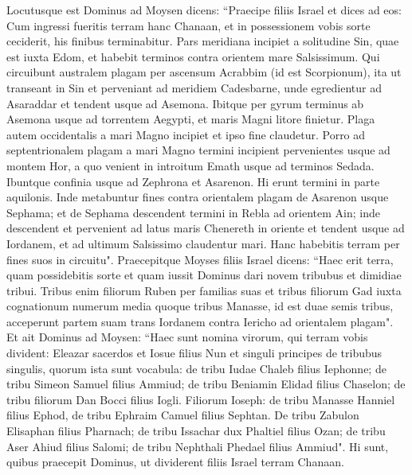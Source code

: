 \begin{biblechapter}  
\verse Locutusque est Dominus ad Moysen dicens: 
\verse “Praecipe filiis Israel et dices ad eos: Cum ingressi fueritis terram hanc Chanaan, et in possessionem vobis sorte ceciderit, his finibus terminabitur. 
\verse Pars meridiana incipiet a solitudine Sin, quae est iuxta Edom, et habebit terminos contra orientem mare Salsissimum. 
\verse Qui circuibunt australem plagam per ascensum Acrabbim (id est Scorpionum), ita ut transeant in Sin et perveniant ad meridiem Cadesbarne, unde egredientur ad Asaraddar et tendent usque ad Asemona. 
\verse Ibitque per gyrum terminus ab Asemona usque ad torrentem Aegypti, et maris Magni litore finietur. 
\verse Plaga autem occidentalis a mari Magno incipiet et ipso fine claudetur. 
\verse Porro ad septentrionalem plagam a mari Magno termini incipient pervenientes usque ad montem Hor, 
\verse a quo venient in introitum Emath usque ad terminos Sedada. 
\verse Ibuntque confinia usque ad Zephrona et Asarenon. Hi erunt termini in parte aquilonis. 
\verse Inde metabuntur fines contra orientalem plagam de Asarenon usque Sephama;  
\verse et de Sephama descendent termini in Rebla ad orientem Ain; inde descendent et pervenient ad latus maris Chenereth in oriente 
\verse et tendent usque ad Iordanem, et ad ultimum Salsissimo claudentur mari. Hanc habebitis terram per fines suos in circuitu". 
\verse Praecepitque Moyses filiis Israel dicens: “Haec erit terra, quam possidebitis sorte et quam iussit Dominus dari novem tribubus et dimidiae tribui. 
\verse Tribus enim filiorum Ruben per familias suas et tribus filiorum Gad iuxta cognationum numerum media quoque tribus Manasse, 
\verse id est duae semis tribus, acceperunt partem suam trans Iordanem contra Iericho ad orientalem plagam". 
\verse Et ait Dominus ad Moysen: 
\verse “Haec sunt nomina virorum, qui terram vobis divident: Eleazar sacerdos et Iosue filius Nun 
\verse et singuli principes de tribubus singulis, 
\verse quorum ista sunt vocabula: de tribu Iudae Chaleb filius Iephonne; 
\verse de tribu Simeon Samuel filius Ammiud; 
\verse de tribu Beniamin Elidad filius Chaselon; 
\verse de tribu filiorum Dan Bocci filius Iogli. 
\verse Filiorum Ioseph: de tribu Manasse Hanniel filius Ephod, 
\verse de tribu Ephraim Camuel filius Sephtan. 
\verse De tribu Zabulon Elisaphan filius Pharnach; 
\verse de tribu Issachar dux Phaltiel filius Ozan; 
\verse de tribu Aser Ahiud filius Salomi; 
\verse de tribu Nephthali Phedael filius Ammiud". 
\verse Hi sunt, quibus praecepit Dominus, ut dividerent filiis Israel terram Chanaan. 
\end{biblechapter}

